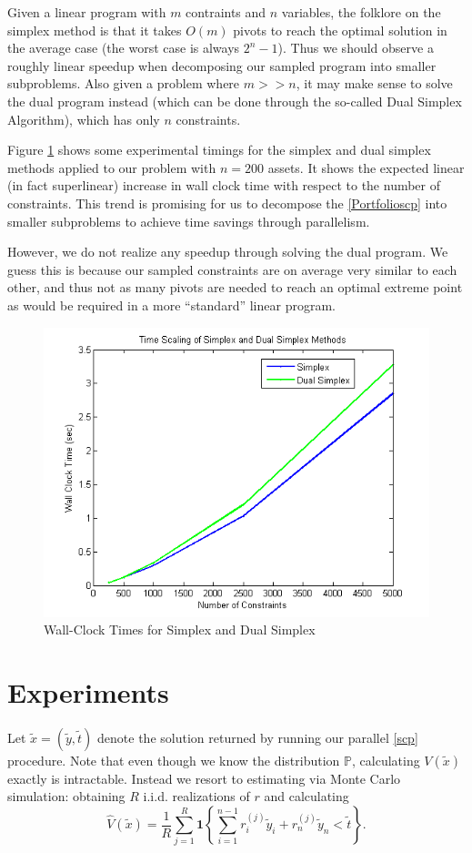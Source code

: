 \documentclass[12pt]{article}
\begin{document}
Given a linear program with $m$ contraints and $n$ variables, the folklore on the simplex method is that it takes $O(m)$ pivots to reach the optimal solution in the average case (the worst case is always $2^n - 1$).
Thus we should observe a roughly linear speedup when decomposing our sampled program into smaller subproblems.
Also given a problem where $m >> n$, it may make sense to solve the dual program instead (which can be done through the so-called Dual Simplex Algorithm), which has only $n$ constraints.

Figure \ref{fig:fig_simplex_time} shows some experimental timings for the simplex and dual simplex methods applied to our problem with $n = 200$ assets.
It shows the expected linear (in fact superlinear) increase in wall clock time with respect to the number of constraints.
This trend is promising for us to decompose the \ref{Portfolioscp} into smaller subproblems to achieve time savings through parallelism.

However, we do not realize any speedup through solving the dual program.  
We guess this is because our sampled constraints are on average very similar to each other, and thus not as many pivots are needed to reach an optimal extreme point as would be required in a more ``standard'' linear program.

\begin{figure}[ht]
	\centering
		\includegraphics{../plot/figs/fig_simplex_time.png}
	\caption{Wall-Clock Times for Simplex and Dual Simplex}
	\label{fig:fig_simplex_time}
\end{figure}


\section*{Experiments}
Let $\tilde{x} = (\tilde{y}, \tilde{t})$ denote the solution returned by running our parallel \ref{scp} procedure.
Note that even though we know the distribution $\mathbb{P}$, calculating $V(\tilde{x})$ exactly is intractable.
Instead we resort to estimating via Monte Carlo simulation: obtaining $R$ i.i.d. realizations of $r$ and calculating
\[ \hat{V}(\tilde{x}) = \frac{1}{R} \sum_{j = 1}^R \mathbf{1}\left\{ \sum_{i=1}^{n-1} r_i^{(j)} \tilde{y}_i + r_n^{(j)} \tilde{y}_n < \tilde{t}\right\}. \]
\end{document}
